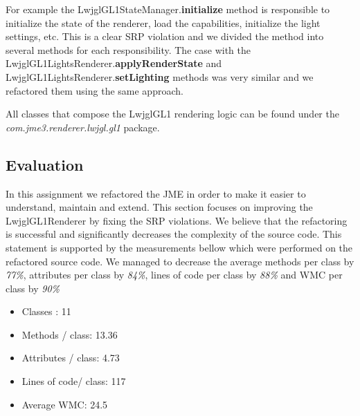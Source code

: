\documentclass[a4paper, notitlepage]{article}
\begin{document}
For example the LwjglGL1StateManager.\textbf{initialize} method is responsible to initialize the state of the renderer, load the capabilities, initialize the light settings, etc. This is a clear SRP violation and we divided the method into several methods for each responsibility. The case with the LwjglGL1LightsRenderer.\textbf{applyRenderState} and LwjglGL1LightsRenderer.\textbf{setLighting} methods was very similar and we refactored them using the same approach. 

All classes that compose the LwjglGL1 rendering logic can be found under the \textit{com.jme3.renderer.lwjgl.gl1} package.


\subsection{Evaluation}

In this assignment we refactored the JME in order to make it easier to understand, maintain and extend. This section focuses on improving the LwjglGL1Renderer by fixing the SRP violations. We believe that the refactoring is successful and significantly decreases the complexity of the source code. This statement is supported by the measurements bellow which were performed on the refactored source code. We managed to decrease the average methods per class by \textit{77\%}, attributes per class by \textit{84\%}, lines of code per class by \textit{88\%} and WMC per class by \textit{90\%}

\begin{itemize}
\item Classes : 11
\item Methods / class: 13.36
\item Attributes / class: 4.73
\item Lines of code/ class: 117
\item Average WMC: 24.5
\end{itemize}
\end{document}
